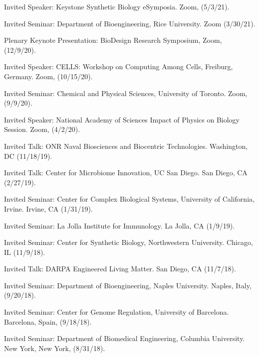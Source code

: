 \item Invited Speaker: Keystone Synthetic Biology eSymposia.  Zoom, (5/3/21).

\item Invited Seminar: Department of Bioengineering, Rice University. Zoom (3/30/21).

\item Plenary Keynote Presentation: BioDesign Research Symposium, Zoom, (12/9/20). 

\item Invited Speaker: CELLS: Workshop on Computing Among Cells, Freiburg, Germany. Zoom, (10/15/20).

\item Invited Seminar: Chemical and Physical Sciences, University of Toronto. Zoom, (9/9/20). 

\item Invited Speaker:  National Academy of Sciences Impact of Physics on Biology Session.  Zoom, (4/2/20).

\item Invited Talk: ONR Naval Biosciences and Biocentric Technologies. Washington, DC (11/18/19). 

\item Invited Talk: Center for Microbiome Innovation, UC San Diego.  San Diego, CA (2/27/19).


\item Invited Seminar: Center for Complex Biological Systems, University of California, Irvine.  Irvine, CA (1/31/19). 

\item Invited Seminar:  La Jolla Institute for Immunology.  La Jolla, CA (1/9/19).

\item Invited Seminar: Center for Synthetic Biology, Northwestern University.  Chicago, IL (11/9/18).

\item Invited Talk:  DARPA Engineered Living Matter.  San Diego, CA (11/7/18). 

\item Invited Seminar:  Department of Bioengineering, Naples University.  Naples, Italy, (9/20/18).

\item Invited Seminar:  Center for Genome Regulation, University of Barcelona.  Barcelona, Spain, (9/18/18).

\item Invited Seminar: Department of Biomedical Engineering, Columbia University. New York, New York, (8/31/18).

